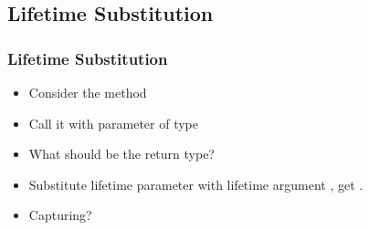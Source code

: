 \subsection{Lifetime Substitution}
\begin{frame}
	\frametitle{Lifetime Substitution}
	\begin{itemize}
		\item Consider the method 
		\item Call it with parameter of type 
		\item What should be the return type?
		\item<2-> Substitute lifetime parameter  with lifetime argument , get .
		\item<3-> Capturing?
	\end{itemize}
\end{frame}


